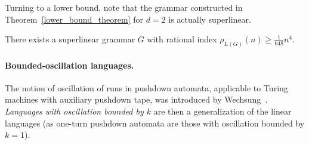 \documentclass[runningheads]{llncs}
\begin{document}
Turning to a lower bound, note that the grammar
constructed in Theorem~\ref{lower_bound_theorem} for $d=2$
is actually superlinear.

\begin{corollary}
There exists a superlinear grammar $G$
with rational index $\rho_{L(G)}(n) \geqslant \frac{1}{648} n^4$.
\end{corollary}






\paragraph{Bounded-oscillation languages.}
The notion of oscillation of runs in pushdown automata,
applicable to Turing machines with auxiliary pushdown tape,
was introduced by Wechsung~\cite{Wechsung}.
\emph{Languages with oscillation bounded by $k$}
are then a generalization of the linear languages
(as one-turn pushdown automata are those with oscillation bounded by $k=1$).
\end{document}

